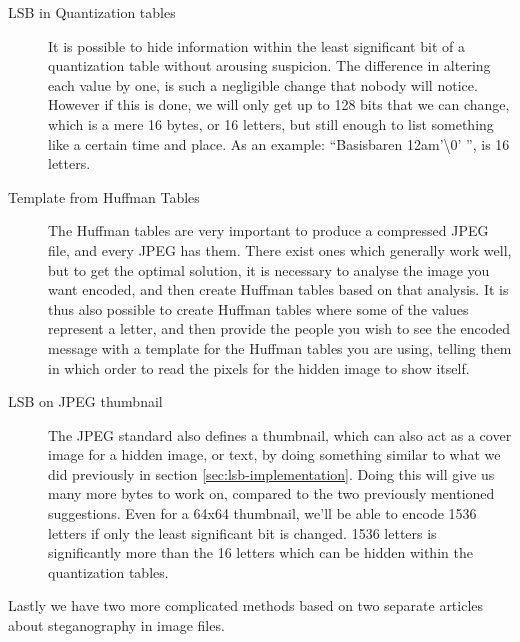 \begin{description}
	\item[LSB in Quantization tables]
	It is possible to hide information within the least significant bit of a quantization table without arousing suspicion.
	The difference in altering each value by one, is such a negligible change that nobody will notice.
	However if this is done, we will only get up to 128 bits that we can change, which is a mere 16 bytes, or 16 letters, but still enough to list something like a certain time and place.
	As an example: ``Basisbaren 12am'\textbackslash0' '', is 16 letters.
	
	\item[Template from Huffman Tables]
	The Huffman tables are very important to produce a compressed JPEG file, and every JPEG has them.
	There exist ones which generally work well, but to get the optimal solution, it is necessary to analyse the image you want encoded, and then create Huffman tables based on that analysis.
	It is thus also possible to create Huffman tables where some of the values represent a letter, and then provide the people you wish to see the encoded message with a template for the Huffman tables you are using, telling them in which order to read the pixels for the hidden image to show itself.
	
	\item[LSB on JPEG thumbnail]
	The JPEG standard also defines a thumbnail, which can also act as a cover image for a hidden image, or text, by doing something similar to what we did previously in section \ref{sec:lsb-implementation}.
	Doing this will give us many more bytes to work on, compared to the two previously mentioned suggestions.
	Even for a 64x64 thumbnail, we'll be able to encode 1536 letters if only the least significant bit is changed. 1536 letters is significantly more than the 16 letters which can be hidden within the quantization tables.
\end{description}

Lastly we have two more complicated methods based on two separate articles about steganography in image files.  

